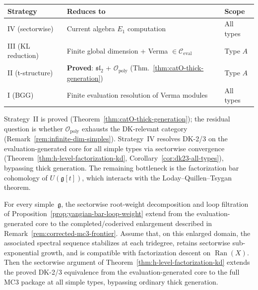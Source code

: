 \begin{remark}
\label{rem:cat-O-strategies-assessment}
\begin{center}
\renewcommand{\arraystretch}{1.2}
\begin{tabular}{lll}
\textbf{Strategy} & \textbf{Reduces to} & \textbf{Scope} \\
\hline
IV (sectorwise) & Current algebra $E_1$ computation
  & All types \\
III (KL reduction) & Finite global dimension +
  Verma $\in \mathcal{C}_{\mathrm{eval}}$ & Type $A$ \\
II (t-structure) & \textbf{Proved}: $\mathfrak{sl}_2$ + $\mathcal{O}_{\mathrm{poly}}$
  (Thm.~\ref{thm:catO-thick-generation}) & Type $A$ \\
I (BGG) & Finite evaluation resolution of Verma modules
  & All types \\
\end{tabular}
\end{center}
Strategy~II is proved (Theorem~\ref{thm:catO-thick-generation}); the residual question is whether $\mathcal{O}_{\mathrm{poly}}$ exhausts the DK-relevant category (Remark~\ref{rem:infinite-dim-simples}).  Strategy~IV resolves DK-2/3 on the evaluation-generated core for all simple types via sectorwise convergence (Theorem~\ref{thm:h-level-factorization-kd}, Corollary~\ref{cor:dk23-all-types}), bypassing thick generation.  The remaining bottleneck is the factorization bar cohomology of $U(\mathfrak{g}[t])$, which interacts with the Loday--Quillen--Tsygan theorem.

\begin{conjecture}\label{conj:mc3-sectorwise-all-types}
For every simple~$\mathfrak{g}$, the sectorwise root-weight
decomposition and loop filtration of
Proposition~\ref{prop:yangian-bar-loop-weight} extend from the
evaluation-generated core to the completed/coderived enlargement
described in Remark~\ref{rem:corrected-mc3-frontier}.  Assume that,
on this enlarged domain, the associated spectral sequence
stabilizes at each tridegree, retains sectorwise sub-exponential
growth, and is compatible with factorization descent on
$\operatorname{Ran}(X)$.  Then the sectorwise argument of
Theorem~\textup{\ref{thm:h-level-factorization-kd}} extends the
proved DK-2/3 equivalence from the evaluation-generated core to the
full MC3 package at all simple types, bypassing ordinary thick
generation.


\end{conjecture}
\end{remark}
